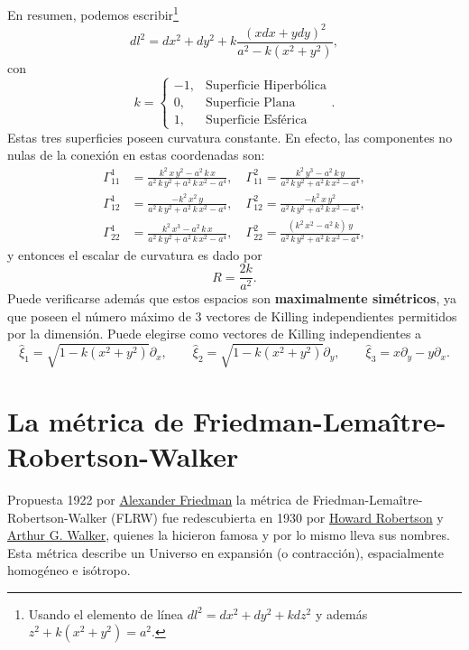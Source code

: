 En resumen, podemos escribir\footnote{Usando el elemento de línea $dl^{2}= dx^{2} + dy^{2} + kdz^{2}$ y además $z^2 +k(x^2 + y^2)=a^2$.}
\begin{equation}
dl^{2}= dx^{2} + dy^{2} + k\frac{(xdx + ydy)^{2}}{a^2-k(x^2 + y^2)},\label{60j}
\end{equation}
con
\begin{equation}
k=\left\{\begin{array}{rl}
-1,& \mbox{Superficie Hiperbólica}\\ \label{61j}
0,& \mbox{Superficie Plana}\\
1,& \mbox{Superficie Esférica}
\end{array}\right. .
\end{equation}
Estas tres superficies poseen curvatura constante. En efecto, las componentes no nulas de la conexión en estas coordenadas son:
\begin{align}
\Gamma^{1}_{11} &= \frac{{k}^{2}\,x\,{y}^{2}-a^{2}\,k\,x}{a^{2}\,k\,{y}^{2}+a^{2}\,k\,{x}^{2}-a^{4}}, \quad
\Gamma^{2}_{11}=\frac{{k}^{2}\,{y}^{3}-a^{2}\,k\,y}{a^{2}\,k\,{y}^{2}+a^{2}\,k\,{x}^{2}-a^{4}}, \\
\Gamma^{1}_{12} &= \frac{-{k}^{2}\,{x}^{2}\,y}{a^{2}\,k\,{y}^{2}+a^{2}\,k\,{x}^{2}-a^{4}},\quad
\Gamma^{2}_{12}=\frac{-{k}^{2}\,x\,{y}^{2}}{a^{2}\,k\,{y}^{2}+a^{2}\,k\,{x}^{2}-a^{4}},\\
\Gamma^{1}_{22} &= \frac{{k}^{2}\,{x}^{3}-a^{2}\,k\,x}{a^{2}\,k\,{y}^{2}+a^{2}\,k\,{x}^{2}-a^{4}}, \quad
\Gamma^{2}_{22}=\frac{\left( {k}^{2}\,{x}^{2}-a^{2}\,k\right) \,y}{a^{2}\,k\,{y}^{2}+a^{2}\,k\,{x}^{2}-a^{4}},
\end{align}
y entonces el escalar de curvatura es dado por
\begin{equation}
R=\frac{2k}{a^2}.
\end{equation}
Puede verificarse además que estos espacios son \textbf{maximalmente simétricos}, ya que poseen el número máximo de 3 vectores de Killing independientes permitidos por la dimensión.
Puede elegirse como vectores de Killing independientes a
\begin{equation}
\hat{\xi}_{1}=\sqrt{1-k(x^2+y^2)}\partial_x, \qquad \hat{\xi}_{2}=\sqrt{1-k(x^2+y^2)}\partial_y, \qquad \hat{\xi}_{3} = x\partial_y -y\partial_x.
\end{equation}

\section{La métrica de Friedman-Lema\^itre-Robertson-Walker}
Propuesta 1922 por \href{http://es.wikipedia.org/wiki/Aleksandr_Fridman}{Alexander Friedman} la métrica de Friedman-Lema\^itre-Robertson-Walker (FLRW) fue redescubierta en 1930 por \href{http://en.wikipedia.org/wiki/Howard_P._Robertson}{Howard Robertson} y \href{http://en.wikipedia.org/wiki/Arthur_Geoffrey_Walker}{Arthur G. Walker}, quienes la hicieron famosa y por lo mismo lleva sus nombres. Esta métrica describe un Universo en expansión (o contracción), espacialmente homogéneo e isótropo.

